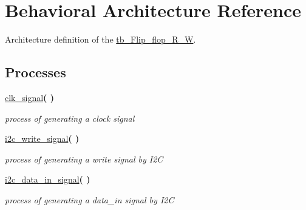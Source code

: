 \hypertarget{classtb___flip__flop___r___w_1_1_behavioral}{}\section{Behavioral Architecture Reference}
\label{classtb___flip__flop___r___w_1_1_behavioral}


Architecture definition of the \hyperlink{classtb___flip__flop___r___w}{tb\+\_\+\+Flip\+\_\+flop\+\_\+\+R\+\_\+W}.  


\subsection*{Processes}
 \begin{DoxyCompactItemize}
\item 
\hyperlink{classtb___flip__flop___r___w_1_1_behavioral_a99f3164d142507cc4972fec85ccfe73a}{clk\+\_\+signal}{\bfseries  (  )}\hypertarget{classtb___flip__flop___r___w_1_1_behavioral_a99f3164d142507cc4972fec85ccfe73a}{}\label{classtb___flip__flop___r___w_1_1_behavioral_a99f3164d142507cc4972fec85ccfe73a}

\begin{DoxyCompactList}\small\item\em process of generating a clock signal \end{DoxyCompactList}\item 
\hyperlink{classtb___flip__flop___r___w_1_1_behavioral_a7c5a4e8821909a45cb59f5d44cc12921}{i2c\+\_\+write\+\_\+signal}{\bfseries  (  )}\hypertarget{classtb___flip__flop___r___w_1_1_behavioral_a7c5a4e8821909a45cb59f5d44cc12921}{}\label{classtb___flip__flop___r___w_1_1_behavioral_a7c5a4e8821909a45cb59f5d44cc12921}

\begin{DoxyCompactList}\small\item\em process of generating a write signal by I2C \end{DoxyCompactList}\item 
\hyperlink{classtb___flip__flop___r___w_1_1_behavioral_adb281d3c5a08af1f297d1fa58248de0e}{i2c\+\_\+data\+\_\+in\+\_\+signal}{\bfseries  (  )}\hypertarget{classtb___flip__flop___r___w_1_1_behavioral_adb281d3c5a08af1f297d1fa58248de0e}{}\label{classtb___flip__flop___r___w_1_1_behavioral_adb281d3c5a08af1f297d1fa58248de0e}

\begin{DoxyCompactList}\small\item\em process of generating a data\+\_\+in signal by I2C \end{DoxyCompactList}\end{DoxyCompactItemize}
